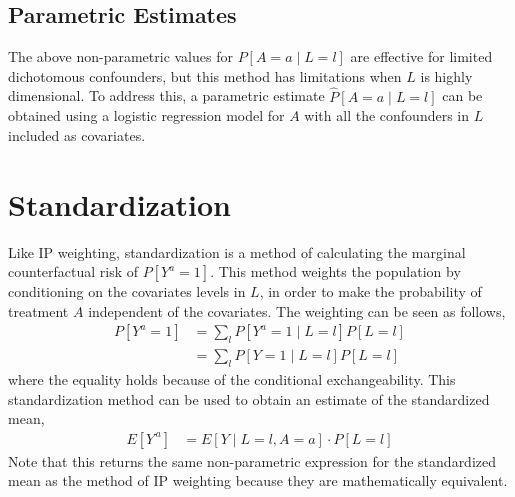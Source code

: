 \subsection{Parametric Estimates} 
The above non-parametric values for $P[A=a\mid L=l]$ are effective for limited dichotomous confounders, but this method has limitations when $L$ is highly dimensional.  To address this, a parametric estimate $\widehat{P}[A=a\mid L=l]$ can be obtained using a logistic regression model for $A$ with all the confounders in $L$ included as covariates.  

\section{Standardization} \label{Standardization} 
Like IP weighting, standardization is a method of calculating the marginal counterfactual risk of $P[Y^a = 1]$.  This method weights the population by  conditioning on the covariates levels in $L$, in order to make the probability of treatment $A$ independent of the covariates.  The weighting can be seen as follows, 
\begin{align} 
P[Y^a = 1] &= \sum_l P[Y^a = 1 \mid L=l] P[L = l] \\ 
&= \sum_l P[Y = 1 \mid L=l] P[L = l]  
\end{align} 
where the equality holds because of the conditional exchangeability.  This standardization method can be used to obtain an estimate of the standardized mean, 
\begin{align} 
E[Y^{\,a}] &= E[Y \mid L = l, A =a ] \cdot P[L=l] 
\end{align} 
Note that this returns the same non-parametric expression for the standardized mean as the method of IP weighting because they are mathematically equivalent.  
